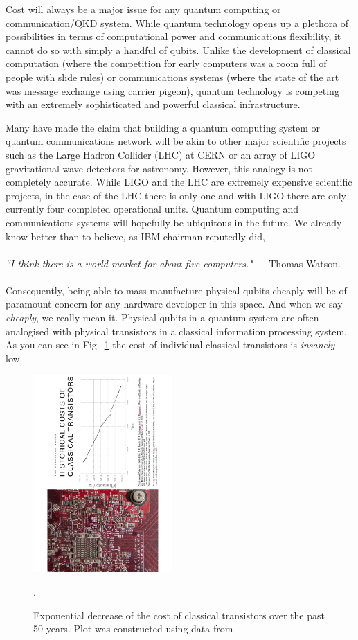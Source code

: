 \documentclass[twocolumn, aps, rmp, amsmath, amssymb, nofootinbib, superscriptaddress, longbibliography, floatfix, table-of-contents, eqsecnum]{revtex4-2}
\newcommand{\famousquote}[2]{\noindent\textit{``#1"} --- #2.\index{Quotes}\index{#2}}
\begin{document}
Cost will always be a major issue for any quantum computing or communication/QKD system. While quantum technology opens up a plethora of possibilities in terms of computational power and communications flexibility, it cannot do so with simply a handful of qubits. Unlike the development of classical computation (where the competition for early computers was a room full of people with slide rules) or communications systems (where the state of the art was message exchange using carrier pigeon), quantum technology is competing with an extremely sophisticated and powerful classical infrastructure. 

Many have made the claim that building a quantum computing system or quantum communications network will be akin to other major scientific projects such as the Large Hadron Collider (LHC) at CERN or an array of LIGO gravitational wave detectors for astronomy. However, this analogy is not completely accurate. While LIGO and the LHC are extremely expensive scientific projects, in the case of the LHC there is only one and with LIGO there are only currently four completed operational units. Quantum computing and communications systems will hopefully be ubiquitous in the future. We already know better than to believe, as IBM chairman reputedly did,
\\
\\
\famousquote{I think there is a world market for about five computers.}{Thomas Watson}
\\
\\
Consequently, being able to mass manufacture physical qubits cheaply will be of paramount concern for any hardware developer in this space. And when we say \textit{cheaply}, we really mean it. Physical qubits in a quantum system are often analogised with physical transistors in a classical information processing system. As you can see in Fig.~\ref{fig:price} the cost of individual classical transistors is \textit{insanely} low. 
 
\begin{figure}[htbp!]
	\includegraphics[clip=true, width=0.475\textwidth]{cost}
	\caption{Exponential decrease of the cost of classical transistors over the past 50 years.  Plot was constructed using data from \cite{SD-Berndt2000,} } \label{fig:price}.
\end{figure}
\end{document}

